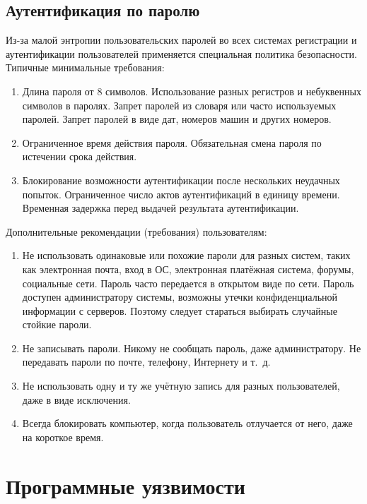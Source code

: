 \documentclass[10pt,a4paper,openany]{book}
\begin{document}
\section{Аутентификация по паролю}

Из-за малой энтропии пользовательских паролей во всех системах регистрации и аутентификации пользователей применяется специальная политика безопасности. Типичные минимальные требования:
\begin{enumerate}
    \item Длина пароля от 8 символов. Использование разных регистров и небуквенных символов в паролях. Запрет паролей из словаря или часто используемых паролей. Запрет паролей в виде дат, номеров машин и других номеров.
    \item Ограниченное время действия пароля. Обязательная смена пароля по истечении срока действия.
    \item Блокирование возможности аутентификации после нескольких неудачных попыток. Ограниченное число актов аутентификаций в единицу времени. Временная задержка перед выдачей результата аутентификации.
\end{enumerate}

Дополнительные рекомендации (требования) пользователям:
\begin{enumerate}
    \item Не использовать одинаковые или похожие пароли для разных систем, таких как электронная почта, вход в ОС, электронная платёжная система, форумы, социальные сети. Пароль часто передается в открытом виде по сети. Пароль доступен администратору системы, возможны утечки конфиденциальной информации с серверов. Поэтому следует стараться выбирать случайные стойкие пароли.
    \item Не записывать пароли. Никому не сообщать пароль, даже администратору. Не передавать пароли по почте, телефону, Интернету и т.~д.
    \item Не использовать одну и ту же учётную запись для разных пользователей, даже в виде исключения.
    \item Всегда блокировать компьютер, когда пользователь отлучается от него, даже на короткое время.
\end{enumerate}





\chapter{Программные уязвимости}
\end{document}
